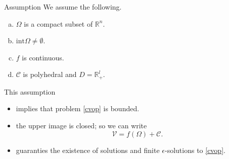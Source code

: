 \documentclass[10pt,xcolor={table,dvipsnames},t,unknownkeysallowed]{beamer}
\newcommand{\R}{\mathbb{R}}
\newcommand{\cone}[1]{\mathcal{#1}}
\newcommand{\intr}{\text{int}}
\begin{document}
\begin{frame}{}

    \begin{block}{Assumption}
        We assume the following.
        \begin{enumerate}[(a)]
            \item $\Omega$ is a compact subset of $\R^n$.
            \item $\intr{\Omega}\not=\emptyset$.
            \item $f$ is continuous.
            \item $\cone{C}$ is polyhedral and $D=\R^l_+$.
        \end{enumerate}
    \end{block}
    This assumption 
    \begin{itemize}
        \item  implies that problem \eqref{cvop} is bounded.
        \item  the upper image is closed; so we can write
    \[
        \cone{V} = f(\Omega)+ \cone{C}.
    \]
    \item guaranties the existence of solutions and finite $\epsilon$-solutions to \eqref{cvop}.
    \end{itemize}
\end{frame}
\end{document}
